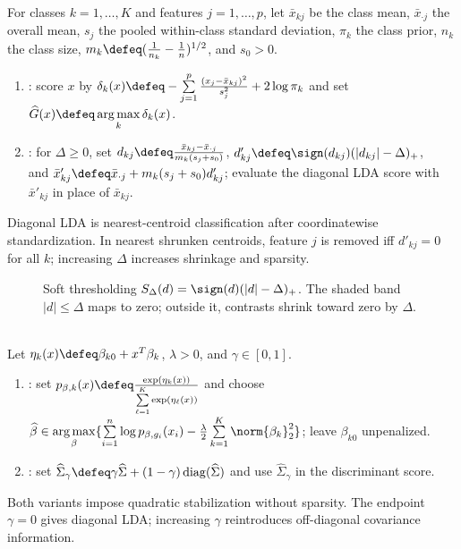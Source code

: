 \begin{method} \label{meth:sl-diagonal-lda-nearest-shrunken-centroids} \\
For classes $k=1,\ldots,K$ and features $j=1,\ldots,p$, let $\bar{x}_{kj}$ be the class mean, $\bar{x}_{\cdot j}$ the overall mean, $s_j$ the pooled within-class standard deviation, $\pi_k$ the class prior, $n_k$ the class size, $m_k\defeq(\frac{1}{n_k}-\frac{1}{n})^{1/2}$, and $s_0>0$.
\begin{enumerate}[label=(\roman*)]
\setlength{\itemsep}{0pt}
\item {}: score $x$ by $\delta_k(x)\defeq-\sum\limits_{j=1}^p \frac{(x_j-\bar{x}_{kj})^2}{s_j^2}+2\log\pi_k$ and set $\widehat{G}(x)\defeq\operatorname*{arg\,max}\limits_k\delta_k(x)$.
\item {}: for $\Delta\geq0$, set $d_{kj}\defeq\frac{\bar{x}_{kj}-\bar{x}_{\cdot j}}{m_k(s_j+s_0)}$, $d'_{kj}\defeq\sign(d_{kj})(|d_{kj}|-\Delta)_+$,\\
and $\bar{x}'_{kj}\defeq\bar{x}_{\cdot j}+m_k(s_j+s_0)d'_{kj}$; evaluate the diagonal LDA score with $\bar{x}'_{kj}$ in place of $\bar{x}_{kj}$.
\end{enumerate}
Diagonal LDA is nearest-centroid classification after coordinatewise standardization. In nearest shrunken centroids, feature $j$ is removed iff $d'_{kj}=0$ for all $k$; increasing $\Delta$ increases shrinkage and sparsity.
\end{method}

\begin{figure}[H]
\centering

\caption{Soft thresholding $S_\Delta(d)=\sign(d)(|d|-\Delta)_+$.  The shaded band $|d|\le\Delta$ maps to zero; outside it, contrasts shrink toward zero by $\Delta$.}
\label{fig:sl-soft-thresholding-rule}
\end{figure}

\begin{method} \label{meth:sl-quadratic-regularized-high-dimensional-linear-rules} \\
Let $\eta_k(x)\defeq\beta_{k0}+x^T\beta_k$, $\lambda>0$, and $\gamma\in[0,1]$.
\begin{enumerate}[label=(\roman*)]
\setlength{\itemsep}{0pt}
\item {}: set $p_{\beta,k}(x)\defeq\frac{\exp(\eta_k(x))}{\sum\limits_{\ell=1}^K\exp(\eta_\ell(x))}$ and choose $\widehat{\beta}\in\operatorname*{arg\,max}\limits_{\beta}\{\sum\limits_{i=1}^n\log p_{\beta,g_i}(x_i)-\frac{\lambda}{2}\sum\limits_{k=1}^K\norm{\beta_k}_2^2\}$; leave $\beta_{k0}$ unpenalized.
\item {}: set $\widehat{\Sigma}_\gamma\defeq\gamma\widehat{\Sigma}+(1-\gamma)\operatorname{diag}(\widehat{\Sigma})$ and use $\widehat{\Sigma}_\gamma$ in the discriminant score.
\end{enumerate}
Both variants impose quadratic stabilization without sparsity. The endpoint $\gamma=0$ gives diagonal LDA; increasing $\gamma$ reintroduces off-diagonal covariance information.
\end{method}

